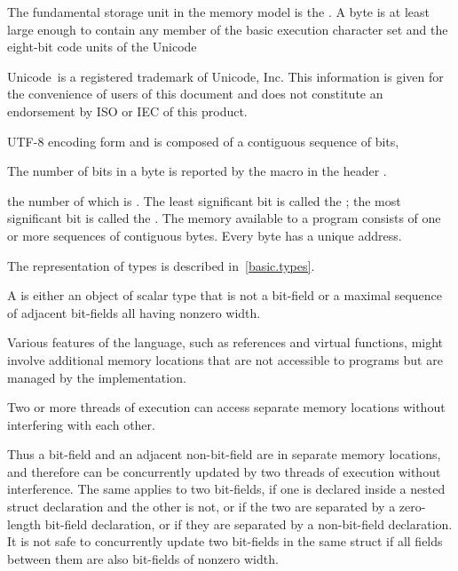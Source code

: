 \pnum
{}%
The fundamental storage unit in the \Cpp{} memory model is the
.
A byte is at least large enough to contain any member of the basic
%
execution character set
and the eight-bit code units of the Unicode
\begin{footnote}
Unicode\textregistered\ is a registered trademark of Unicode, Inc.
This information is given for the convenience of users of this document and
does not constitute an endorsement by ISO or IEC of this product.
\end{footnote}
UTF-8 encoding form
and is composed of a contiguous sequence of
bits,
\begin{footnote}
The number of bits in a byte is reported by the macro
 in the header .
\end{footnote}
the number of which is . The least
significant bit is called the ; the most
significant bit is called the . The memory
available to a \Cpp{} program consists of one or more sequences of
contiguous bytes. Every byte has a unique address.

\pnum
\begin{note}
The representation of types is described
in~\ref{basic.types}.
\end{note}

\pnum
A  is either an object of scalar type that is not a bit-field
or a maximal sequence of adjacent bit-fields all having nonzero width.
\begin{note}
Various
features of the language, such as references and virtual functions, might
involve additional memory locations that are not accessible to programs but are
managed by the implementation.
\end{note}
Two or more threads of
execution can access separate memory
locations without interfering with each other.

\pnum
\begin{note}
Thus a bit-field and an adjacent non-bit-field are in separate memory
locations, and therefore can be concurrently updated by two threads of execution
without interference. The same applies to two bit-fields, if one is declared
inside a nested struct declaration and the other is not, or if the two are
separated by a zero-length bit-field declaration, or if they are separated by a
non-bit-field declaration. It is not safe to concurrently update two bit-fields
in the same struct if all fields between them are also bit-fields of nonzero
width.
\end{note}

